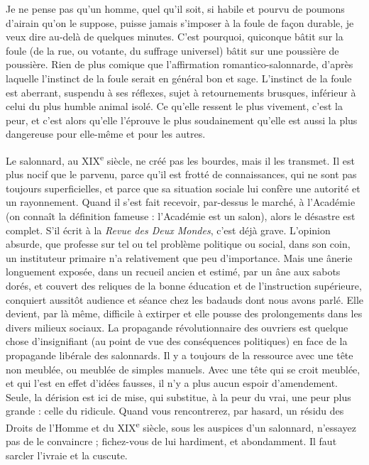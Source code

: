 \documentclass[french,twoside]{book} %
\begin{document}
Je ne pense pas qu’un homme, quel qu’il soit, si habile et pourvu de poumons d’airain qu’on le suppose, puisse jamais s’imposer à la foule de façon durable, je veux dire au-delà de quelques minutes. C’est pourquoi, quiconque bâtit sur la foule (de la rue, ou votante, du suffrage universel) bâtit sur une poussière de poussière. Rien de plus comique que l’affirmation romantico-salonnarde, d’après laquelle l’instinct de la foule serait en général bon et sage. L’instinct de la foule est aberrant, suspendu à ses réflexes, sujet à retournements brusques, inférieur à celui du plus humble animal isolé. Ce qu’elle ressent le plus vivement, c’est la peur, et c’est alors qu’elle l’éprouve le plus soudainement qu’elle est aussi la plus dangereuse pour elle-même et pour les autres.\par
Le salonnard, au XIX\textsuperscript{e} siècle, ne créé pas les bourdes, mais il les transmet. Il est plus nocif que le parvenu, parce qu’il est frotté de connaissances, qui ne sont pas toujours superficielles, et parce que sa situation sociale lui confère une autorité et un rayonnement. Quand il s’est fait recevoir, par-dessus le marché, à l’Académie (on connaît la définition fameuse : l’Académie est un salon), alors le désastre est complet. S’il écrit à la {\itshape Revue des Deux Mondes}, c’est déjà grave. L’opinion absurde, que professe sur tel ou tel problème politique ou social, dans son coin, un instituteur primaire n’a relativement que peu d’importance. Mais une ânerie longuement exposée, dans un recueil ancien et estimé, par un âne aux sabots dorés, et couvert des reliques de la bonne éducation et de l’instruction supérieure, conquiert aussitôt audience et séance chez les badauds dont nous avons parlé. Elle devient, par là même, difficile à extirper et elle pousse des prolongements dans les divers milieux sociaux. La propagande révolutionnaire des ouvriers est quelque chose d’insignifiant (au point de vue des conséquences politiques) en face de la propagande libérale des salonnards. Il y a toujours de la ressource avec une tête non meublée, ou meublée de simples manuels. Avec une tête qui se croit meublée, et qui l’est en effet d’idées fausses, il n’y a plus aucun espoir d’amendement. Seule, la dérision est ici de mise, qui substitue, à la peur du vrai, une peur plus grande : celle du ridicule. Quand vous rencontrerez, par hasard, un résidu des Droits de l’Homme et du XIX\textsuperscript{e} siècle, sous les auspices d’un salonnard, n’essayez pas de le convaincre ; fichez-vous de lui hardiment, et abondamment. Il faut sarcler l’ivraie et la cuscute.\par
\end{document}

